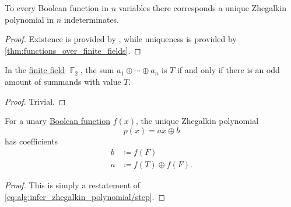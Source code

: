 \begin{proposition}\label{thm:zhegalkin_polynomial_uniqueness}
  To every Boolean function in \( n \) variables there corresponds a unique Zhegalkin polynomial in \( n \) indeterminates.
\end{proposition}
\begin{proof}
  Existence is provided by , while uniqueness is provided by \cref{thm:functions_over_finite_fields}.
\end{proof}

\begin{lemma}\label{thm:f2_sum_parity}
  In the \hyperref[def:finite_field]{finite field} \( \BbbF_2 \), the sum \( a_1 \oplus \cdots \oplus a_n \) is \( T \) if and only if there is an odd amount of summands with value \( T \).
\end{lemma}
\begin{proof}
  Trivial.
\end{proof}

\begin{proposition}\label{thm:unary_boolean_function_zhegalkin_polynomial}
  For a unary \hyperref[def:boolean_function]{Boolean function} \( f(x) \), the unique Zhegalkin polynomial
  \begin{equation}\label{eq:thm:unary_boolean_function_zhegalkin_polynomial}
    p(x) = ax \oplus b
  \end{equation}
  has coefficients
  \begin{align*}
    b &\coloneqq f(F) \\
    a &\coloneqq f(T) \oplus f(F).
  \end{align*}
\end{proposition}
\begin{proof}
  This is simply a restatement of \eqref{eq:alg:infer_zhegalkin_polynomial/step}.
\end{proof}

